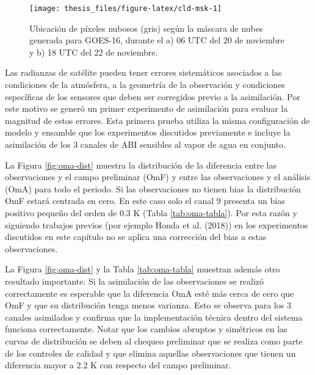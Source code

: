 \documentclass[12pt,oneside,a4paper]{reedthesis}
\begin{document}
\begin{figure}
\texttt{[image: thesis\_files/figure-latex/cld-msk-1]} \caption{Ubicación de píxeles nubosos (gris) según la máscara de nubes generada para GOES-16, durante el a) 06 UTC del 20 de noviembre y b) 18 UTC del 22 de noviembre.}\label{fig:cld-msk}
\end{figure}
Las radianzas de satélite pueden tener errores sistemáticos asociados a las condiciones de la atmósfera, a la geometría de la observación y condiciones específicas de los sensores que deben ser corregidos previo a la asimilación. Por este motivo se generó un primer experimento de asimilación para evaluar la magnitud de estos errores. Esta primera prueba utiliza la misma configuración de modelo y ensamble que los experimentos discutidos previamente e incluye la asimilación de los 3 canales de ABI sensibles al vapor de agua en conjunto.

La Figura \ref{fig:oma-dist} muestra la distribución de la diferencia entre las observaciones y el campo preliminar (OmF) y entre las observaciones y el análisis (OmA) para todo el periodo. Si las observaciones no tienen bias la distribución OmF estará centrada en cero. En este caso solo el canal 9 presenta un bias positivo pequeño del orden de 0.3 K (Tabla \ref{tab:oma-tabla}). Por esta razón y siguiendo trabajos previos (por ejemplo Honda et al. (2018)) en los experimentos discutidos en este capítulo no se aplica una corrección del bias a estas observaciones.

La Figura \ref{fig:oma-dist} y la Tabla \ref{tab:oma-tabla} muestran además otro resultado importante. Si la asimilación de las observaciones se realizó correctamente es esperable que la diferencia OmA esté más cerca de cero que OmF y que su distribución tenga menos varianza. Esto se observa para los 3 canales asimilados y confirma que la implementación técnica dentro del sistema funciona correctamente. Notar que los cambios abruptos y simétricos en las curvas de distribución se deben al chequeo preliminar que se realiza como parte de los controles de calidad y que elimina aquellas observaciones que tienen un diferencia mayor a 2.2 K con respecto del campo preliminar.
\end{document}
